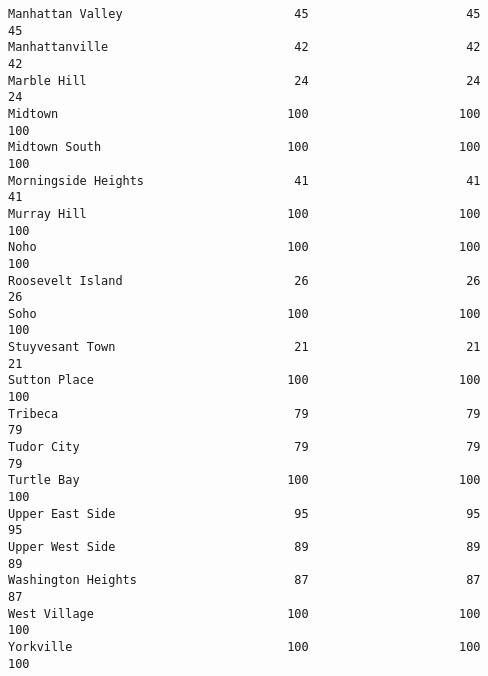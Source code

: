 \documentclass[11pt]{article}
\begin{document}
\begin{tcolorbox}[breakable, size=fbox, boxrule=.5pt, pad at break*=1mm, opacityfill=0]
\begin{Verbatim}[commandchars=\\\{\}]
Manhattan Valley                        45                      45     45
Manhattanville                          42                      42     42
Marble Hill                             24                      24     24
Midtown                                100                     100    100
Midtown South                          100                     100    100
Morningside Heights                     41                      41     41
Murray Hill                            100                     100    100
Noho                                   100                     100    100
Roosevelt Island                        26                      26     26
Soho                                   100                     100    100
Stuyvesant Town                         21                      21     21
Sutton Place                           100                     100    100
Tribeca                                 79                      79     79
Tudor City                              79                      79     79
Turtle Bay                             100                     100    100
Upper East Side                         95                      95     95
Upper West Side                         89                      89     89
Washington Heights                      87                      87     87
West Village                           100                     100    100
Yorkville                              100                     100    100


\end{Verbatim}
\end{tcolorbox}
\end{document}

